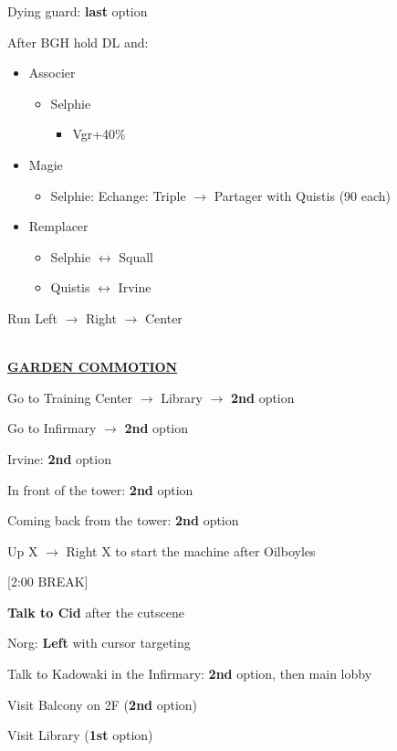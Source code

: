 Dying guard: \textbf{last} option

After BGH hold DL and:
\begin{menu}
	\begin{itemize}
		\item Associer
			\begin{itemize}
				\item Selphie
					\begin{itemize}
						\item Vgr+40\%
					\end{itemize}
			\end{itemize}
		\item Magie
			\begin{itemize}
				\item Selphie: Echange: Triple $\rightarrow$ Partager with Quistis (90 each)
			\end{itemize}
		\item Remplacer
			\begin{itemize}
				\item Selphie $\leftrightarrow$ Squall
				\item Quistis $\leftrightarrow$ Irvine
			\end{itemize}
	\end{itemize}
\end{menu}

Run Left $\rightarrow$ Right $\rightarrow$ Center

\leavevmode\\
\underline{\textbf{GARDEN COMMOTION}}

Go to Training Center $\rightarrow$ Library $\rightarrow$ \textbf{2nd} option

Go to Infirmary $\rightarrow$ \textbf{2nd} option

Irvine: \textbf{2nd} option 

In front of the tower: \textbf{2nd} option

Coming back from the tower: \textbf{2nd} option

Up X $\rightarrow$ Right X to start the machine after Oilboyles

[2:00 BREAK]

\textbf{Talk to Cid} after the cutscene

Norg: \textbf{Left} with cursor targeting

Talk to Kadowaki in the Infirmary: \textbf{2nd} option, then main lobby

Visit Balcony on 2F (\textbf{2nd} option)

Visit Library (\textbf{1st} option)


